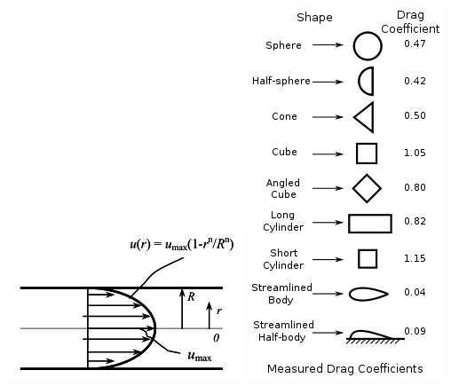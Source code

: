 \documentclass[12pt,a4paper]{article}
\renewcommand{\=}[1]{\stackrel{#1}{=}}
\theoremstyle{definition}
\theoremstyle{remark}
\begin{document}
\begin{center}
\begin{minipage}[t]{.4\linewidth}
\includegraphics[width=\linewidth]{pic/rohr.png}
\includegraphics[width=\linewidth]{pic/luftcw.png}
\end{minipage}
\end{center}
\end{document}
